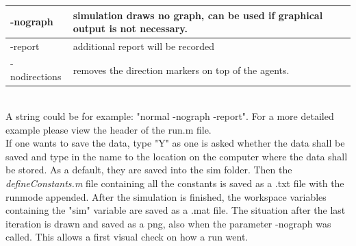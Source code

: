 \begin{tabular}{|p{3cm}|p{10cm}|}
      \hline
      -nograph & simulation draws no graph, can be used if graphical output is not necessary.\\ \hline
      -report & additional report will be recorded\\ \hline
      -nodirections & removes the direction markers on top of the agents.\\
      \hline
\end{tabular}\\

\noi A string could be for example: "normal -nograph -report". For a more detailed example please view the header of the run.m file. \\

\noi If one wants to save the data, type "Y" as one is asked whether the data shall be saved and type in the name to the location on the computer where the data shall be stored. As a default, they are saved into the sim folder. Then the \textit{defineConstants.m} file containing all the constants is saved as a .txt file with the runmode appended. After the simulation is finished, the workspace variables containing the "sim" variable are saved as a .mat file. The situation after the last iteration is drawn and saved as a png, also when the parameter -nograph was called. This allows a first visual check on how a run went.


